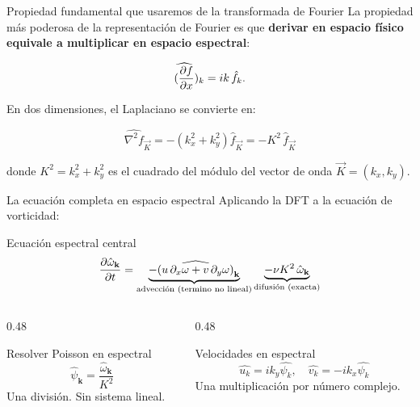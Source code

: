 \documentclass[aspectratio=169, 12pt]{beamer}
\newcommand{\that}[1]{\hat{#1}}
\begin{document}
\begin{frame}{Propiedad fundamental que usaremos de la transformada de Fourier}
La propiedad más poderosa de la representación de Fourier es que
\textbf{derivar en espacio físico equivale a multiplicar en espacio
espectral}:
 
\begin{equation}
  \widehat{(\pdv{f}{x}})_k = ik\,\that{f}_k.
  \label{eq:deriv_espectral}
\end{equation}
 
En dos dimensiones, el Laplaciano se convierte en:
 
 $$ \widehat{\nabla^2 f}_{\vec{K}} = -(k_x^2 + k_y^2)\that{f}_{\vec{K}} = -K^2\,\that{f}_\vec{K}$$
 
donde $K^2 = k_x^2 + k_y^2$ es el cuadrado del módulo del
vector de onda $\vec{K} = (k_x, k_y)$.

\end{frame}

\begin{frame}{La ecuación completa en espacio espectral}
  Aplicando la DFT a la ecuación de vorticidad:

  \begin{alertblock}{Ecuación espectral central}
    \[
      \pdv{\hat{\omega}_\mathbf{k}}{t} =
      \underbrace{-\widehat{(u\,\partial_x\omega
                  + v\,\partial_y\omega)}_\mathbf{k}}_{\text{advección (termino no lineal)}}
      \underbrace{- \nu K^2\,\hat{\omega}_\mathbf{k}}_{\text{difusión (exacta)}}
    \]
  \end{alertblock}

  \vspace{0.5em}
  \begin{columns}
    \begin{column}{0.48\textwidth}
      \begin{block}{Resolver Poisson en espectral}
        \[
          \hat{\psi}_\mathbf{k} = \frac{\hat{\omega}_\mathbf{k}}{K^2}
        \]
        Una división. Sin sistema lineal.
      \end{block}
    \end{column}
    \begin{column}{0.48\textwidth}
      \begin{block}{Velocidades en espectral}
        \[
          \hat{u_k} = ik_y\hat{\psi_k}, \quad
          \hat{v_k} = -ik_x\hat{\psi_k}
        \]
        Una multiplicación por número complejo.
      \end{block}
    \end{column}
  \end{columns}
\end{frame}
\end{document}
